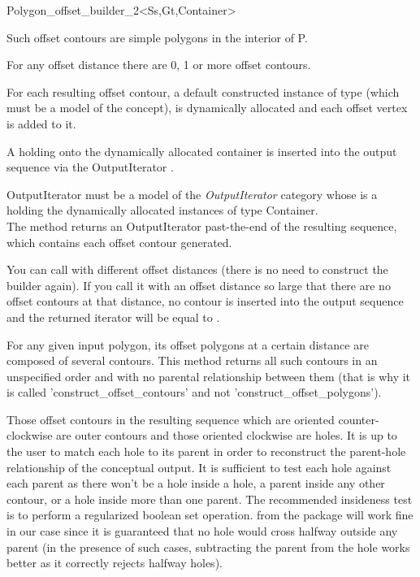 \begin{ccRefClass}{Polygon_offset_builder_2<Ss,Gt,Container>}
{Such offset contours are simple polygons in the interior of P.

For any offset distance  there are 0, 1 or more offset contours.

For each resulting offset contour, a default constructed instance of  type (which must be a model of the  concept), is dynamically allocated and each offset vertex is added to it.

A  holding onto the dynamically allocated container is inserted into the output sequence via the OutputIterator .

OutputIterator must be a model of the \textit{OutputIterator} category whose  is a  holding the dynamically allocated instances of type Container.\\
The method returns an OutputIterator past-the-end of the resulting sequence, which contains each offset contour generated.

You can call  with different offset distances (there is no need to construct the builder  again). If you call it with an offset distance so large that there are no offset contours at that distance, no contour is inserted into the output sequence and the returned iterator will be equal to .

For any given input polygon, its offset polygons at a certain distance are composed of several contours. This method returns all such contours in an unspecified order and with no parental relationship between them (that is why it is called 'construct_offset_contours' and not 'construct_offset_polygons').

Those offset contours in the resulting sequence which are oriented counter-clockwise are outer contours and those oriented clockwise are holes. It is up to the user to match each hole to its parent in order to reconstruct the parent-hole relationship of the conceptual output. It is sufficient to test each hole against each parent as there won't be a hole inside a hole, a parent inside any other contour, or a hole inside more than one parent. The recommended insideness test is to perform a regularized boolean set operation.  from the  package will work fine in our case since it is guaranteed that no hole would cross halfway outside any parent (in the presence of such cases, subtracting the parent from the hole works better as it correctly rejects halfway holes).}
  

\ccSeeAlso
{}\\
\\
\\
\end{ccRefClass}

